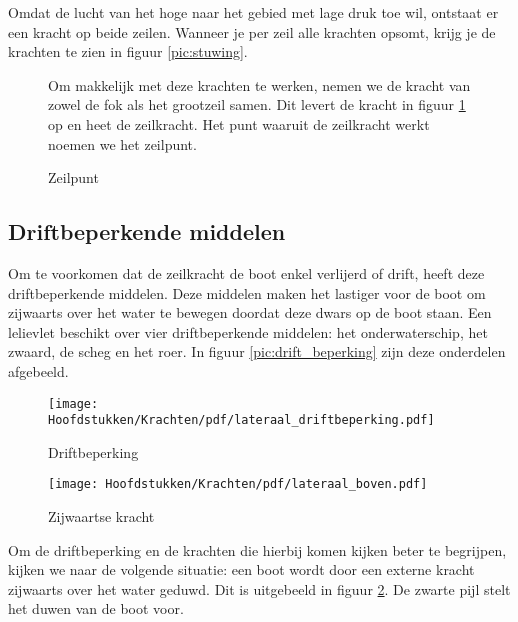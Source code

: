 Omdat de lucht van het hoge naar het gebied met lage druk toe wil, ontstaat er een kracht op beide zeilen. Wanneer je per zeil alle krachten opsomt, krijg je de krachten te zien in figuur \ref{pic:stuwing}.

\begin{figure}[H]
	\centering
	\begin{minipage}[t]{0.63\textwidth}
		\vspace*{0.2cm}
		Om makkelijk met deze krachten te werken, nemen we de kracht van zowel de fok als het grootzeil samen. Dit levert de kracht in figuur \ref{pic:zeilpunt} op en heet de zeilkracht. Het punt waaruit de zeilkracht werkt noemen we het zeilpunt. 
	\end{minipage}
	\hfill
	\begin{minipage}[t]{0.32\textwidth}
		\RemoveLine
		\caption{Zeilpunt}
		\label{pic:zeilpunt}
	\end{minipage}
\end{figure} 

\subsection{Driftbeperkende middelen}
Om te voorkomen dat de zeilkracht de boot enkel verlijerd of drift, heeft deze driftbeperkende middelen. Deze middelen maken het lastiger voor de boot om zijwaarts over het water te bewegen doordat deze dwars op de boot staan. Een lelievlet beschikt over vier driftbeperkende middelen: het onderwaterschip, het zwaard, de scheg en het roer. In figuur \ref{pic:drift_beperking} zijn deze onderdelen afgebeeld.

\begin{figure}[H]
	\centering
	\begin{minipage}[b]{0.48\textwidth}
		\centering
		\texttt{[image: Hoofdstukken/Krachten/pdf/lateraal\_driftbeperking.pdf]}
		\caption{Driftbeperking}
		\label{pic:drift_beperking}
	\end{minipage}
	\hfill
	\begin{minipage}[b]{0.48\textwidth}
		\centering
		\texttt{[image: Hoofdstukken/Krachten/pdf/lateraal\_boven.pdf]}
		\caption{Zijwaartse kracht}
		\label{pic:zijwaarts}
	\end{minipage}
\end{figure}
Om de driftbeperking en de krachten die hierbij komen kijken beter te begrijpen, kijken we naar de volgende situatie: een boot wordt door een externe kracht zijwaarts over het water geduwd. Dit is uitgebeeld in figuur \ref{pic:zijwaarts}. De zwarte pijl stelt het duwen van de boot voor. 

